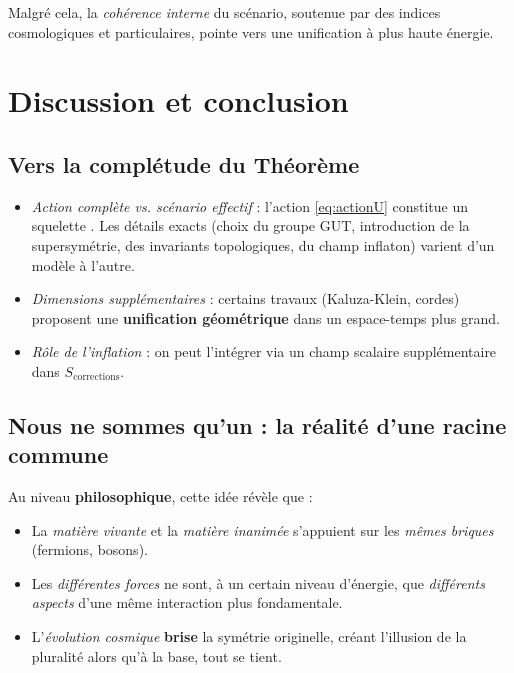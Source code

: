 \documentclass[12pt]{article}
\begin{document}
Malgr\'e cela, la \emph{coh\'erence interne} du sc\'enario, soutenue par des indices 
cosmologiques et particulaires, pointe vers une unification \`a plus haute \'energie.

\section{Discussion et conclusion}
\label{sec:discussion}

\subsection{Vers la compl\'etude du Th\'eor\`eme}

\begin{itemize}
    \item \emph{Action compl\`ete vs. sc\'enario effectif} : 
    l'action \eqref{eq:actionU} constitue un \og squelette \fg. 
    Les d\'etails exacts (choix du groupe GUT, introduction de la supersym\'etrie, 
    des invariants topologiques, du champ inflaton) varient d'un mod\`ele \`a l'autre.  
    \item \emph{Dimensions suppl\'ementaires} : 
    certains travaux (Kaluza-Klein, cordes) proposent une \textbf{unification g\'eom\'etrique} 
    dans un espace-temps plus grand.  
    \item \emph{R\^ole de l'inflation} : 
    on peut l'int\'egrer via un champ scalaire suppl\'ementaire dans $S_{\text{corrections}}$.  
\end{itemize}

\subsection{\og Nous ne sommes qu'un \fg : la r\'ealit\'e d'une racine commune}

Au niveau \textbf{philosophique}, cette id\'ee r\'ev\`ele que :
\begin{itemize}
    \item La \emph{mati\`ere vivante} et la \emph{mati\`ere inanim\'ee} s'appuient 
    sur les \emph{m\^emes briques} (fermions, bosons).  
    \item Les \emph{diff\'erentes forces} ne sont, \`a un certain niveau d'\'energie, 
    que \emph{diff\'erents aspects} d'une m\^eme interaction plus fondamentale.  
    \item L'\emph{\'evolution cosmique} \textbf{brise} la sym\'etrie originelle, 
    cr\'eant l'\og illusion \fg{} de la pluralit\'e alors qu'\`a la base, tout se tient.  
\end{itemize}
\end{document}
